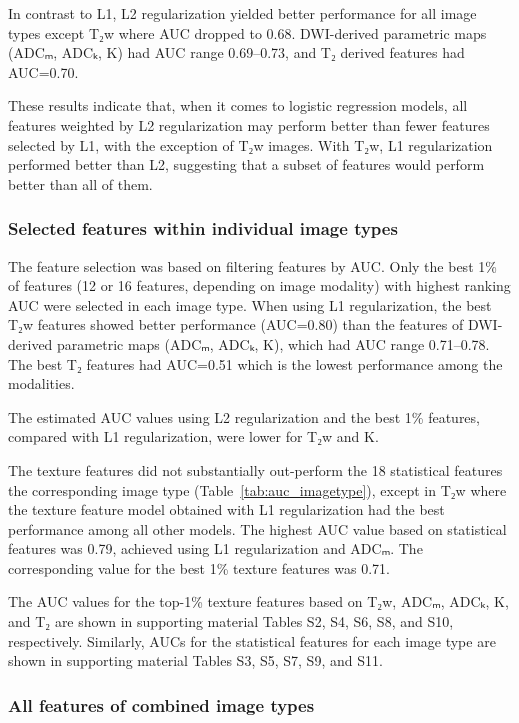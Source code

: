 In contrast to L1, L2 regularization yielded better performance for all image
types except T₂w where AUC dropped to 0.68. DWI-derived parametric maps (ADCₘ,
ADCₖ, K) had AUC range 0.69--0.73, and T₂ derived features had AUC=0.70.

These results indicate that, when it comes to logistic regression models, all
features weighted by L2 regularization may perform better than fewer features
selected by L1, with the exception of T₂w images. With T₂w, L1 regularization
performed better than L2, suggesting that a subset of features would perform
better than all of them.


\subsubsection{Selected features within individual image types}

The feature selection was based on filtering features by AUC\@. Only the best
1\% of features (12 or 16 features, depending on image modality) with highest
ranking AUC were selected in each image type. When using L1 regularization, the
best T₂w features showed better performance (AUC=0.80) than the features of
DWI-derived parametric maps (ADCₘ, ADCₖ, K), which had AUC range 0.71--0.78. The
best T₂ features had AUC=0.51 which is the lowest performance among the
modalities.

The estimated AUC values using L2 regularization and the best 1\% features,
compared with L1 regularization, were lower for T₂w and K.

The texture features did not substantially out-perform the 18 statistical
features the corresponding image type (Table~\ref{tab:auc_imagetype}), except in
T₂w where the texture feature model obtained with L1 regularization had the best
performance among all other models. The highest AUC value based on statistical
features was 0.79, achieved using L1 regularization and ADCₘ. The corresponding
value for the best 1\% texture features was 0.71.

The AUC values for the top-1\% texture features based on T₂w, ADCₘ, ADCₖ, K,
and T₂ are shown in supporting material Tables S2, S4, S6, S8, and S10,
respectively. Similarly, AUCs for the statistical features for each image
type are shown in supporting material Tables S3, S5, S7, S9, and S11.


\subsubsection{All features of combined image types}

